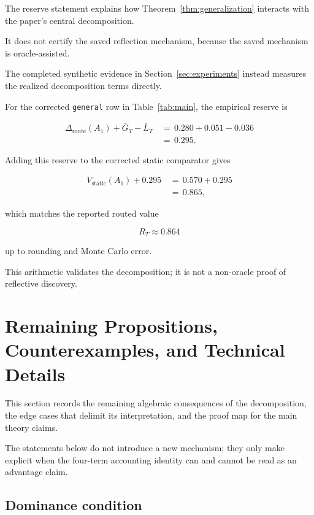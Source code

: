 \documentclass{article} %
\begin{document}
The reserve statement explains how Theorem~\ref{thm:generalization} interacts with the paper's central decomposition.

It does not certify the saved reflection mechanism, because the saved mechanism is oracle-assisted.

The completed synthetic evidence in Section~\ref{sec:experiments} instead measures the realized decomposition terms directly.

For the corrected \texttt{general} row in Table~\ref{tab:main}, the empirical reserve is

\begin{align}
\label{eq:app-third-general-reserve}
\Delta_{\mathrm{route}}(A_1)
+
\bar G_T
-
\bar L_T
&\,=\,
0.280+0.051-0.036
\\
&\,=\,
0.295.
\end{align}

Adding this reserve to the corrected static comparator gives

\begin{align}
\label{eq:app-third-general-value}
V_{\mathrm{static}}(A_1)
+
0.295
&\,=\,
0.570+0.295
\\
&\,=\,
0.865,
\end{align}

which matches the reported routed value

\begin{equation}
\label{eq:app-third-general-reported}
R_T
\approx
0.864
\end{equation}

up to rounding and Monte Carlo error.

This arithmetic validates the decomposition; it is not a non-oracle proof of reflective discovery.

\section{Remaining Propositions, Counterexamples, and Technical Details}

\label{app:proofs4}

This section records the remaining algebraic consequences of the decomposition, the edge cases that delimit its interpretation, and the proof map for the main theory claims.

The statements below do not introduce a new mechanism; they only make explicit when the four-term accounting identity can and cannot be read as an advantage claim.

\subsection{Dominance condition}
\end{document}
